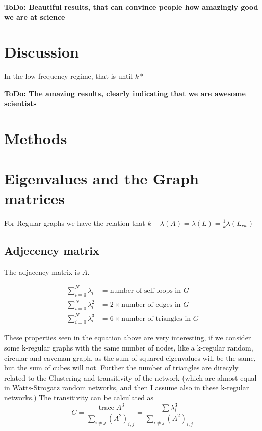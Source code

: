 \documentclass[fleqn,10pt]{wlscirep}
\newcommand{\TODO}[1]{{\bf {\color{red} ToDo:} #1}}
\begin{document}
\TODO{Beautiful results, that can convince people how amazingly good we are at science}



\section*{Discussion}

In the low frequency regime, that is until $k*$

\TODO{The amazing results, clearly indicating that we are awesome scientists}



\section*{Methods}

\section*{Eigenvalues and the Graph matrices}
For Regular graphs we have the relation that $k - \lambda(A) = \lambda(L) = \frac{1}{k}\lambda(L_{rw})$
\subsection*{Adjecency matrix}
The adjacency matrix is $A$.

\begin{align}
  \sum_{i=0}^{N} \lambda_i &= \mathrm{\text{number of self-loops  in }}G \\
  \sum_{i=0}^{N} \lambda_i^2 &= 2 \times \mathrm{\text{number of edges in }}G \\
  \sum_{i=0}^{N} \lambda_i^3 &= 6 \times \mathrm{\text{number of triangles in }}G
\end{align}

These properties seen in the equation above are very interesting, if we consider some k-regular graphs with the same number of nodes, like a k-regular random, circular and caveman graph, as the sum of squared eigenvalues will be the same, but the sum of cubes will not. Further the number of triangles are direcyly related to the Clustering and transitivity of the network (which are almost equal in Watts-Strogatz random networks, and then I assume also in these k-regular networks.) The transitivity can be calculated as 
\begin{equation}
  C = \frac{\operatorname{trace}A^3}{\sum_{i \neq j} (A^2)_{i,j}} =  \frac{\sum\lambda_i^3}{\sum_{i \neq j} (A^2)_{i,j}} 
\end{equation}
\end{document}
